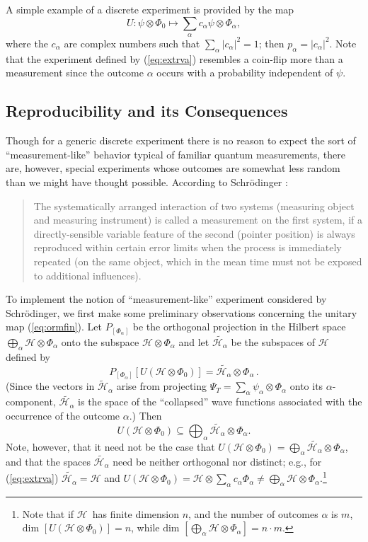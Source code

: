 \documentclass[12pt]{article}
\newcommand{\eq}[1]{(\ref{#1})}
\newcommand{\Sc}{Schr\"{o}dinger}
\newcommand{\wf}{wave function}
\renewcommand{\a}{\alpha}
\newcommand{\suma}{\sum_{\a }}
\newcommand{\ot}{\otimes}
\newcommand{\biga}{\bigoplus_{\a}}
\newcommand{\psia}{\psi_{\a}}
\newcommand{\Phia}{\Phi_{\a}}
\renewcommand{\H}{\mbox{$\mathcal{H}$}}
\begin{document}
A simple example of a discrete experiment is provided by the map
\begin{equation}
U: \psi\ot\Phi_0 \mapsto \suma c_\a
\psi\ot\Phia,
\label{eq:extrva}
\end{equation}
%
where the $c_{\a}$ are complex numbers such that $\suma
|c_{\a}|^{2}=1$; then $ p_{\a}=|c_{\a}|^{2}$.  Note that the
experiment defined by \eq{eq:extrva} resembles a coin-flip more than a
measurement since the outcome $\a$ occurs with a probability
independent of $\psi$.



\subsection{Reproducibility and its Consequences}
\label{sec:RC}
Though for a generic discrete experiment there is no reason to expect
the sort of ``measurement-like'' behavior typical of familiar quantum
measurements, there are, however, special experiments whose outcomes
are somewhat less random than we might have thought possible.
According to \Sc{} \cite{Sch35}:

\begin{quotation}\small\noindent
   The systematically arranged interaction of two systems (measuring
   object and measuring instrument) is called a measurement on the
   first system, if a directly-sensible variable feature of the second
   (pointer position) is always reproduced within certain error limits
   when the process is immediately repeated (on the same object, which
   in the mean time must not be exposed to additional influences).
\end{quotation}


To implement the notion of ``measurement-like'' experiment considered
by \Sc{}, we first make some preliminary observations concerning the
unitary map (\ref{eq:ormfin}).  Let $P_{[\Phia]}$ be the orthogonal
projection in the Hilbert space $\biga \mathcal{H}\ot\Phia$ onto the
subspace ${\H}\ot\Phia$ and let $\widetilde{\mathcal{H}_{\a}}$ be the
subspaces of $\H$ defined by
%
\begin{equation}
P_{[\Phia]}\left[ U({\H}\ot\Phi_0) \right]
=\widetilde{\mathcal{H}_{\a}}\ot\Phia\,.
\label{eq:htilde}
\end{equation}
%
(Since the vectors in $\widetilde{\mathcal{H}}_{\a}$ arise {}from
projecting $\Psi_{T}=\suma \psia \ot \Phia$ onto its $\a$-component,
$\widetilde{\mathcal{H}_{\a}}$ is the space of the ``collapsed''
\wf{}s associated with the occurrence of the outcome $\a$.)  Then
\begin{equation}
U({\H}\ot\Phi_0) \subseteq
\biga\widetilde{\mathcal{H}_{\a}}\ot\Phia.
\label{eq:rep2}
\end{equation}
Note, however, that it need not be the case that
$U({\H}\ot\Phi_0)=\biga\widetilde{\mathcal{H}_{\a}}\ot\Phia$, and that
the spaces $\widetilde{\mathcal{H}_{\a}}$ need be neither orthogonal
nor distinct; e.g., for (\ref{eq:extrva})
$\widetilde{\mathcal{H}_{\a}}=\H$ and $U({\H}\ot\Phi_0)=\H\ot\sum_\a
c_\a\Phia\neq\biga {\H}\ot\Phia$.\footnote{Note that if \H\ has finite
   dimension $n$, and the number of outcomes $\a$ is $m$, $\mbox{dim
   }[U({\H}\ot\Phi_0)]= n$, while $\mbox{dim }[\biga {\H}\ot\Phia] =
   n\cdot m$.}
\end{document}
